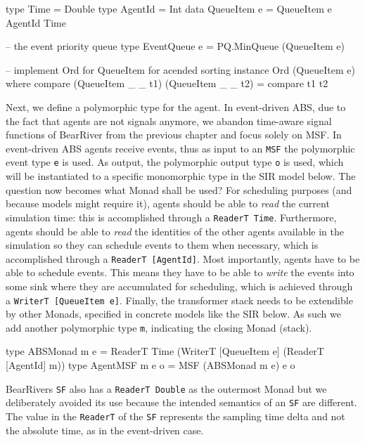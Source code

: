 \begin{HaskellCode}
type Time        = Double
type AgentId     = Int
data QueueItem e = QueueItem e AgentId Time

-- the event priority queue
type EventQueue e = PQ.MinQueue (QueueItem e)

-- implement Ord for QueueItem for acended sorting
instance Ord (QueueItem e) where
  compare (QueueItem _ _ t1) (QueueItem _ _ t2) = compare t1 t2
\end{HaskellCode}

Next, we define a polymorphic type for the agent. In event-driven ABS, due to the fact that agents are not signals anymore, we abandon time-aware signal functions of BearRiver from the previous chapter and focus solely on MSF. In event-driven ABS agents receive events, thus as input to an \texttt{MSF} the polymorphic event type \texttt{e} is used. As output, the polymorphic output type \texttt{o} is used, which will be instantiated to a specific monomorphic type in the SIR model below. The question now becomes what Monad shall be used? For scheduling purposes (and because models might require it), agents should be able to \textit{read} the current simulation time: this is accomplished through a \texttt{ReaderT Time}. Furthermore, agents should be able to \textit{read} the identities of the other agents available in the simulation so they can schedule events to them when necessary, which is accomplished through a \texttt{ReaderT [AgentId]}. Most importantly, agents have to be able to schedule events. This means they have to be able to \textit{write} the events into some sink where they are accumulated for scheduling, which is achieved through a \texttt{WriterT [QueueItem e]}. Finally, the transformer stack needs to be extendible by other Monads, specified in concrete models like the SIR below. As such we add another polymorphic type \texttt{m}, indicating the closing Monad (stack).

\begin{HaskellCode}
type ABSMonad m e   = ReaderT Time (WriterT [QueueItem e] (ReaderT [AgentId] m))
type AgentMSF m e o = MSF (ABSMonad m e) e o
\end{HaskellCode}

BearRivers \texttt{SF} also has a \texttt{ReaderT Double} as the outermost Monad but we deliberately avoided its use because the intended semantics of an \texttt{SF} are different. The value in the \texttt{ReaderT} of the \texttt{SF} represents the sampling time delta and not the absolute time, as in the event-driven case.

